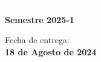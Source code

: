 \begin{titlepage}
    \begin{minipage}{0.4\textwidth}
        \textcolor{white}{Semestre}\\
        \large\textbf{Semestre 2025-1}      
    \end{minipage}
    \begin{minipage}{0.4\textwidth}
        \begin{flushright}
            {\large Fecha de entrega:\\
             \textbf{18 de Agosto de 2024}}
        \end{flushright}
    \end{minipage}
    
    \makeatother
    
    \vfill 
    \end{titlepage}
